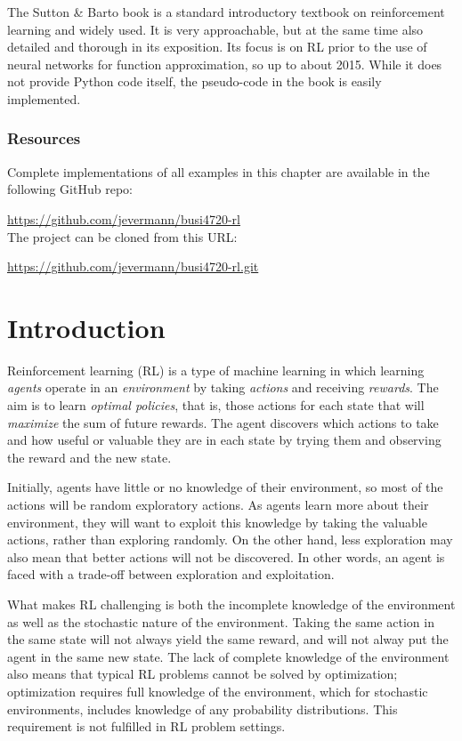 The Sutton \& Barto book is a standard introductory textbook on reinforcement learning and widely used. It is very approachable, but at the same time also detailed and thorough in its exposition. Its focus is on RL prior to the use of neural networks for function approximation, so up to about 2015. While it does not provide Python code itself, the pseudo-code in the book is easily implemented.

\begin{tcolorbox}[colback=alert]
\subsubsection*{Resources}
Complete implementations of all examples in this chapter are available in the following GitHub repo:

\url{https://github.com/jevermann/busi4720-rl} \\

The project can be cloned from this URL:

\url{https://github.com/jevermann/busi4720-rl.git}
\end{tcolorbox}


\section{Introduction}

Reinforcement learning (RL) is a type of machine learning in which learning \emph{agents} operate in an \emph{environment} by taking \emph{actions} and receiving \emph{rewards}. The aim is to learn \emph{optimal policies}, that is, those actions for each state that will \emph{maximize} the sum of future rewards. The agent discovers which actions to take and how useful or valuable they are in each state by trying them and observing the reward and the new state. 

Initially, agents have little or no knowledge of their environment, so most of the actions will be random exploratory actions. As agents learn more about their environment, they will want to exploit this knowledge by taking the valuable actions, rather than exploring randomly. On the other hand, less exploration may also mean that better actions will not be discovered. In other words, an agent is faced with a trade-off between exploration and exploitation.

What makes RL challenging is both the incomplete knowledge of the environment as well as the stochastic nature of the environment. Taking the same action in the same state will not always yield the same reward, and will not alway put the agent in the same new state. The lack of complete knowledge of the environment also means that typical RL problems cannot be solved by optimization; optimization requires full knowledge of the environment, which for stochastic environments, includes knowledge of any probability distributions. This requirement is not fulfilled in RL problem settings.

